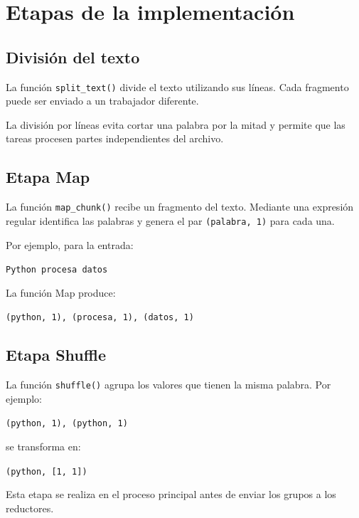 \section{Etapas de la implementación}

\subsection{División del texto}

La función \texttt{split\_text()} divide el texto utilizando sus líneas.
Cada fragmento puede ser enviado a un trabajador diferente.

La división por líneas evita cortar una palabra por la mitad y permite que
las tareas procesen partes independientes del archivo.

\subsection{Etapa Map}

La función \texttt{map\_chunk()} recibe un fragmento del texto. Mediante una
expresión regular identifica las palabras y genera el par
\texttt{(palabra, 1)} para cada una.

Por ejemplo, para la entrada:

\begin{center}
\texttt{Python procesa datos}
\end{center}

La función Map produce:

\begin{center}
\texttt{(python, 1), (procesa, 1), (datos, 1)}
\end{center}

\subsection{Etapa Shuffle}

La función \texttt{shuffle()} agrupa los valores que tienen la misma palabra.
Por ejemplo:

\begin{center}
\texttt{(python, 1), (python, 1)}
\end{center}

se transforma en:

\begin{center}
\texttt{(python, [1, 1])}
\end{center}

Esta etapa se realiza en el proceso principal antes de enviar los grupos a
los reductores.

